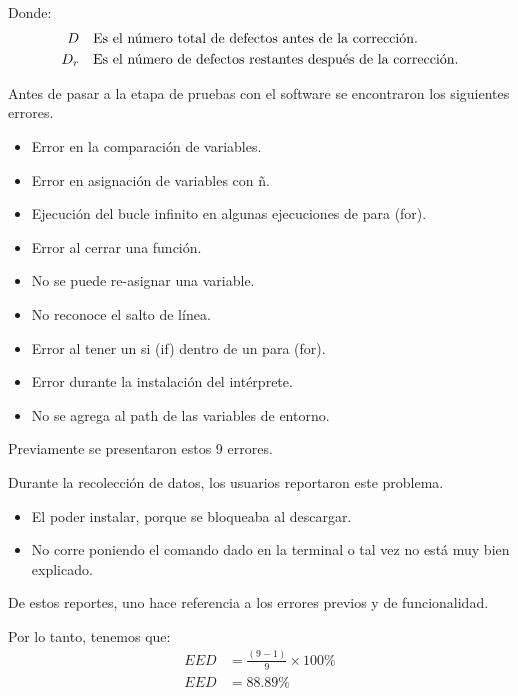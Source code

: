 Donde:
\begin{equation*}
  \begin{split}
    D & \quad \textnormal{Es el número total de defectos antes de la corrección.}\\
    D_r & \quad \textnormal{Es el número de defectos restantes después de la corrección.}
  \end{split}
\end{equation*}

Antes de pasar a la etapa de pruebas con el software se encontraron los siguientes errores.

\begin{itemize}
  \item Error en la comparación de variables.
  \item Error en asignación de variables con ñ.
  \item Ejecución del bucle infinito en algunas ejecuciones de para (for).
  \item Error al cerrar una función.
  \item No se puede re-asignar una variable.
  \item No reconoce el salto de línea.
  \item Error al tener un si (if) dentro de un para (for).
  \item Error durante la instalación del intérprete.
  \item No se agrega al path de las variables de entorno.
\end{itemize}

Previamente se presentaron estos 9 errores.

Durante la recolección de datos, los usuarios reportaron este problema.
\begin{itemize}
  \item El poder instalar, porque se bloqueaba al descargar.
  \item No corre poniendo el comando dado en la terminal o tal vez no está muy  bien explicado.
\end{itemize}

De estos reportes, uno hace referencia a los errores previos y de funcionalidad.

Por lo tanto, tenemos que:
\begin{equation*}
  \begin{split}
    EED & = \frac{(9 - 1)}{9} \times 100\% \\
    EED & = 88.89 \%
  \end{split}
\end{equation*}

